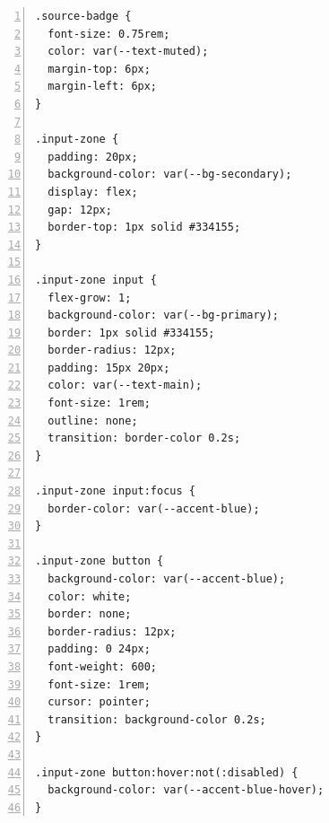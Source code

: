 \documentclass[12pt,a4paper]{report}
\begin{document}
\begin{lstlisting}[language=HTML, basicstyle=\ttfamily\tiny, breaklines=true, frame=single, numbers=left]
.source-badge {
  font-size: 0.75rem;
  color: var(--text-muted);
  margin-top: 6px;
  margin-left: 6px;
}

.input-zone {
  padding: 20px;
  background-color: var(--bg-secondary);
  display: flex;
  gap: 12px;
  border-top: 1px solid #334155;
}

.input-zone input {
  flex-grow: 1;
  background-color: var(--bg-primary);
  border: 1px solid #334155;
  border-radius: 12px;
  padding: 15px 20px;
  color: var(--text-main);
  font-size: 1rem;
  outline: none;
  transition: border-color 0.2s;
}

.input-zone input:focus {
  border-color: var(--accent-blue);
}

.input-zone button {
  background-color: var(--accent-blue);
  color: white;
  border: none;
  border-radius: 12px;
  padding: 0 24px;
  font-weight: 600;
  font-size: 1rem;
  cursor: pointer;
  transition: background-color 0.2s;
}

.input-zone button:hover:not(:disabled) {
  background-color: var(--accent-blue-hover);
}
\end{lstlisting}
\end{document}
